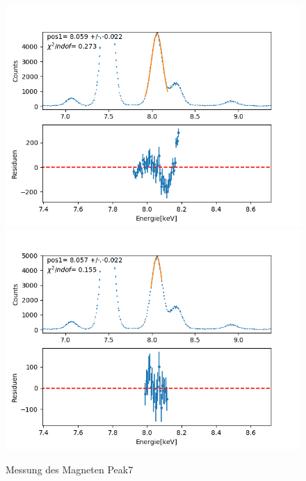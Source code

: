 \documentclass[12pt,a4paper]{article}
\begin{document}
\begin{figure}[H]
\centering
\includegraphics[scale=0.49]{Bilder/roentgen_spektren/magnet/mag7_1.png}
\includegraphics[scale=0.49]{Bilder/roentgen_spektren/magnet/mag7_2.png}
\caption{Messung des Magneten Peak7}
\end{figure}
\end{document}
